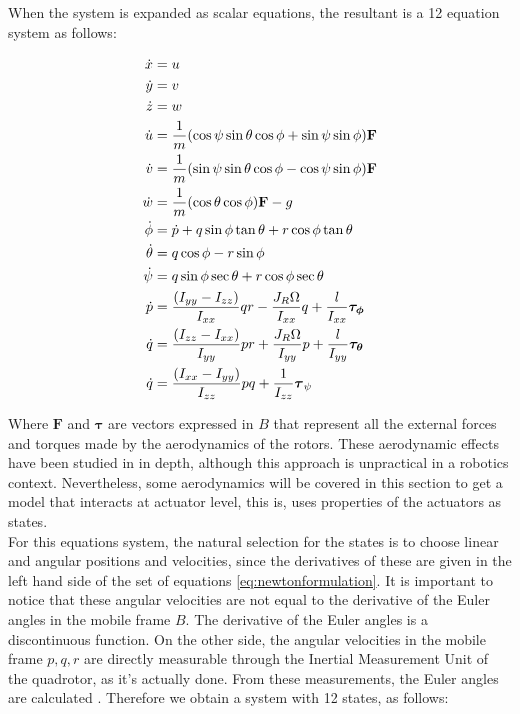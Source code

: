 When the system is expanded as scalar equations, the resultant is a 12 equation system as follows:

\begin{equation} 
\begin{subequations} \label{eq:newtonformulationexpanded}
\begin{align}
	\dot{x} &= u \label{first}\\
	\dot{y} &= v \label{second}\\
	\dot{z} &= w \label{third}\\
	\dot{u} &= \frac{1}{m}(\cos{\psi}\sin{\theta}\cos{\phi} + \sin{\psi}\sin{\phi})\mathbf{F} \label{fourth}\\
	\dot{v} &= \frac{1}{m}(\sin{\psi}\sin{\theta}\cos{\phi} - \cos{\psi}\sin{\phi})\mathbf{F} \label{fifth}\\
	\dot{w} &= \frac{1}{m}(\cos{\theta}\cos{\phi})\mathbf{F} - g\label{sixth}\\
	\dot{\phi} &= \dot{p} + q\sin{\phi}\tan{\theta} +r\cos{\phi}\tan{\theta} \label{seventh}\\
	\dot{\theta} &=  q\cos{\phi} - r\sin{\phi}\label{eighth}\\
	\dot{\psi} &= q\sin{\phi}\sec{\theta} + r\cos{\phi}\sec{\theta}\label{nineth}\\
	\dot{p} &= \frac{(I_{yy} - I_{zz})}{I_{xx}}qr - \frac{J_R\Omega}{I_{xx}}q + \frac{l}{I_{xx}}\boldsymbol{\tau_{\phi}}\label{tenth}\\
	\dot{q} &= \frac{(I_{zz} - I_{xx})}{I_{yy}}pr + \frac{J_R\Omega}{I_{yy}}p + \frac{l}{I_{yy}}\boldsymbol{\tau_{\theta}}\label{eleventh}\\
	\dot{q} &= \frac{(I_{xx} - I_{yy})}{I_{zz}}pq + \frac{1}{I_{zz}}\boldsymbol{\tau}_{\psi} \label{twelveth}\\
\end{align}
\end{subequations}
\end{equation}

Where $\mathbf{F}$ and $\boldsymbol{\tau}$ are vectors expressed in {$B$} that represent all the external forces and torques made by the aerodynamics of the rotors. These aerodynamic effects have been studied in \cite{Hoffmann2007} in depth, although this approach is unpractical in a robotics context. Nevertheless, some aerodynamics will be covered in this section to get a model that interacts at actuator level, this is, uses properties of the actuators as states. \\

For this equations system, the natural selection for the states is to choose linear and angular positions and velocities, since the derivatives of these are given in the left hand side of the set of equations \ref{eq:newtonformulation}. It is important to notice that these angular velocities are not equal to the derivative of the Euler angles in the mobile frame {$B$}. The derivative of the Euler angles is a discontinuous function. On the other side, the angular velocities in the mobile frame {$p, q, r$} are directly measurable through the Inertial Measurement Unit of the quadrotor, as it's actually done. From these measurements, the Euler angles are calculated \cite{Raffo2007}. Therefore we obtain a system with 12 states, as follows:

